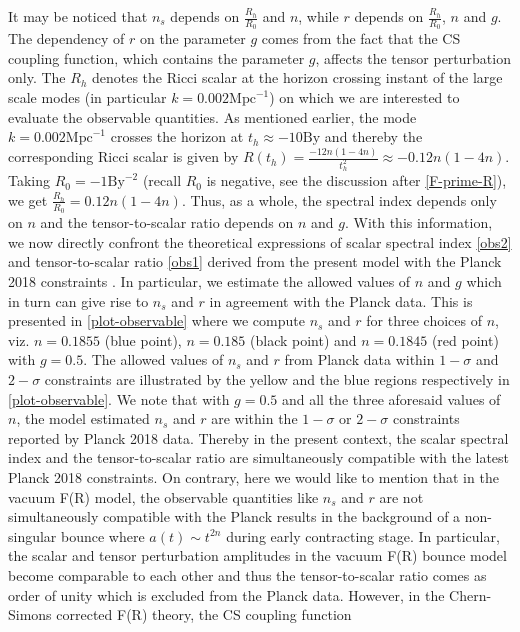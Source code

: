 \documentclass{article}
\begin{document}
It may be noticed that $n_s$ depends on $\frac{R_h}{R_0}$ and $n$, while $r$ depends on 
$\frac{R_h}{R_0}$, $n$ and $g$. The dependency of $r$ on the parameter $g$ comes from the fact that the CS coupling function, which 
contains the parameter $g$, affects the tensor perturbation only. The $R_h$ denotes the Ricci scalar at the horizon crossing 
instant of the large scale modes (in particular $k = 0.002\mathrm{Mpc}^{-1}$) on which we are interested to evaluate the observable quantities. As mentioned 
earlier, the mode $k = 0.002\mathrm{Mpc}^{-1}$ crosses the horizon at $t_h \approx -10\mathrm{By}$ and thereby the corresponding 
Ricci scalar is given by $R(t_h) = \frac{-12n(1-4n)}{t_h^2} \approx -0.12n(1-4n)$. Taking $R_0 = -1\mathrm{By}^{-2}$ (recall $R_0$ is negative, 
see the discussion after \ref{F-prime-R}), we get $\frac{R_h}{R_0} = 0.12n(1-4n)$. Thus, as a whole, the spectral index 
depends only on $n$ and the tensor-to-scalar ratio depends on $n$ and $g$. 
With this information, we now directly confront the theoretical expressions of scalar spectral index \ref{obs2}
and tensor-to-scalar ratio \ref{obs1} derived from the present model with the Planck 2018 constraints 
\cite{Akrami:2018odb}. In particular,  we estimate the allowed values of $n$ and $g$ 
which in turn can give rise to $n_s$ and $r$ in agreement with the Planck data. 
This is presented in \ref{plot-observable} where we compute $n_s$ and $r$ for three choices 
of $n$, viz. $n = 0.1855$ (blue point), $n = 0.185$ (black point) and $n = 0.1845$ (red point) 
with $g = 0.5$. The allowed values of $n_s$ and $r$ from 
Planck data within $1-\sigma$ and $2-\sigma$ constraints are illustrated by the yellow and the blue regions 
respectively in \ref{plot-observable}. We note that with $g = 0.5$ and all the three aforesaid values 
of $n$, the model estimated $n_s$ and $r$ are within the $1-\sigma$ or $2-\sigma$ constraints reported by Planck 2018 data. 
Thereby in the present context, the scalar spectral index and the tensor-to-scalar ratio are simultaneously compatible with the latest Planck 2018 
constraints. On contrary, here we would like to mention that in the vacuum F(R) model, the observable quantities like $n_s$ and $r$ are not 
simultaneously compatible with the Planck results in the background of a non-singular bounce where $a(t) \sim t^{2n}$ during early contracting stage. 
In particular, the scalar and tensor perturbation amplitudes in the vacuum F(R) bounce model become comparable to each other and thus the tensor-to-scalar 
ratio comes as order of unity which is excluded from the Planck data. However, in the Chern-Simons corrected F(R) theory, the CS coupling function 
\end{document}

